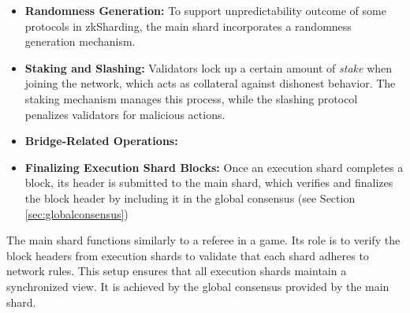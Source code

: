 \begin{itemize}
	\item \textbf{Randomness Generation:}
	      To support unpredictability outcome of some protocols in
	      zkSharding, the main shard incorporates a
	      randomness generation mechanism.

	\item \textbf{Staking and Slashing:} Validators lock up a certain
	      amount of \emph{stake} when joining the network, which acts
	      as collateral
	      against dishonest behavior. The staking mechanism manages
	      this process,
	      while the slashing protocol penalizes validators for
	      malicious actions.

	\item \textbf{Bridge-Related Operations:}

	\item \textbf{Finalizing Execution Shard Blocks:} Once an
	      execution shard completes a block, its header is submitted
	      to the main
	      shard, which verifies and finalizes the block header by
	      including it in the
	      global consensus (see Section \ref{sec:globalconsensus})
\end{itemize}

The main shard functions similarly to a referee in a
game. Its role is to verify the block
headers from execution shards to validate that each shard adheres to
network rules.	
This setup ensures that all execution shards maintain a synchronized view.
It is achieved by the global consensus provided by the main shard.

